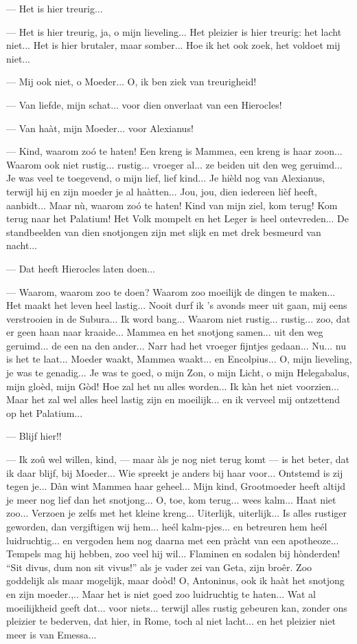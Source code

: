 \documentclass[a4paper, 12pt, oneside, dutch]{article}
\begin{document}
--- Het is hier treurig...

--- Het is hier treurig, ja, o mijn lieveling... Het pleizier is hier treurig: het lacht niet... Het is hier brutaler, maar somber... Hoe ik het ook zoek, het voldoet mij niet...

--- Mij ook niet, o Moeder... O, ik ben ziek van treurigheid!

--- Van liefde, mijn schat... voor dien onverlaat van een Hierocles!

--- Van haàt, mijn Moeder... voor Alexianus!

--- Kind, waarom zoó te haten! Een kreng is Mammea, een kreng is haar zoon... Waarom ook niet rustig... rustig... vroeger al... ze beiden uit den weg geruimd... Je was veel te toegevend, o mijn lief, lief kind... Je hièld nog van Alexianus, terwijl hij en zijn moeder je al haàtten... Jou, jou, dien iedereen lièf heeft, aanbidt... Maar nù, waarom zoó te haten! Kind van mijn ziel, kom terug! Kom terug naar het Palatium! Het Volk mompelt en het Leger is heel ontevreden... De standbeelden van dien snotjongen zijn met slijk en met drek besmeurd van nacht...

--- Dat heeft Hierocles laten doen...

--- Waarom, waarom zoo te doen? Waarom zoo moeilijk de dingen te maken... Het maakt het leven heel lastig... Nooit durf ik 's avonds meer uit gaan, mij eens verstrooien in de Subura... Ik word bang... Waarom niet rustig... rustig... zoo, dat er geen haan naar kraaide... Mammea en het snotjong samen... uit den weg geruimd... de een na den ander... Narr had het vroeger fijntjes gedaan... Nu... nu is het te laat... Moeder waakt, Mammea waakt... en Encolpius... O, mijn lieveling, je was te genadig... Je was te goed, o mijn Zon, o mijn Licht, o mijn Helegabalus, mijn gloèd, mijn Gòd! Hoe zal het nu alles worden... Ik kàn het niet voorzien... Maar het zal wel alles heel lastig zijn en moeilijk... en ik verveel mij ontzettend op het Palatium...

--- Blijf hier!!

--- Ik zoû wel willen, kind, --- maar àls je nog niet terug komt --- is het beter, dat ik daar blijf, bij Moeder... Wie spreekt je anders bij haar voor... Ontstemd is zij tegen je... Dàn wint Mammea haar geheel... Mijn kind, Grootmoeder heeft altijd je meer nog lief dan het snotjong... O, toe, kom terug... wees kalm... Haat niet zoo... Verzoen je zelfs met het kleine kreng... Uiterlijk, uiterlijk... Is alles rustiger geworden, dan vergiftigen wij hem... heél kalm-pjes... en betreuren hem heél luidruchtig... en vergoden hem nog daarna met een pràcht van een apotheoze... Tempels mag hij hebben, zoo veel hij wil... Flaminen en sodalen bij hònderden! "`Sit divus, dum non sit vivus!"' als je vader zei van Geta, zijn broêr. Zoo goddelijk als maar mogelijk, maar doòd! O, Antoninus, ook ik haàt het snotjong en zijn moeder.,.. Maar het is niet goed zoo luidruchtig te haten... Wat al moeilijkheid geeft dat... voor niets... terwijl alles rustig gebeuren kan, zonder ons pleizier te bederven, dat hier, in Rome, toch al niet lacht... en het pleizier niet meer is van Emessa...
\end{document}
